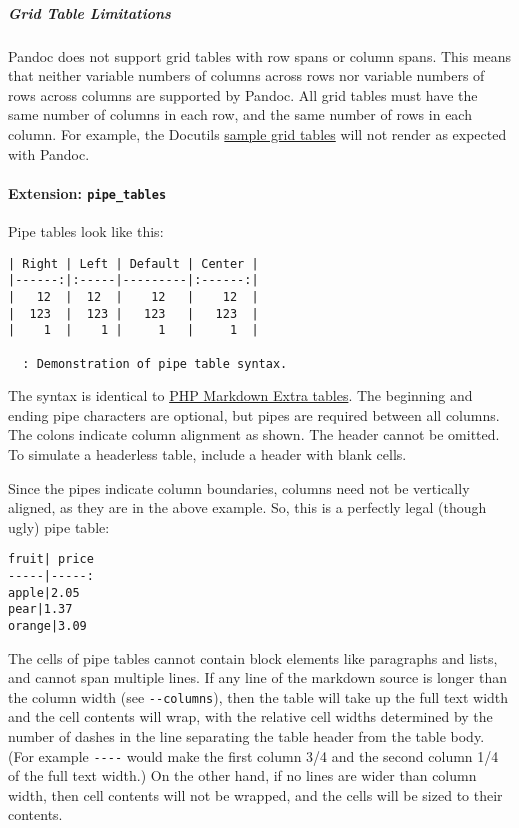 \documentclass[
]{article}
\begin{document}
\subparagraph{Grid Table Limitations}\label{grid-table-limitations}

Pandoc does not support grid tables with row spans or column spans. This
means that neither variable numbers of columns across rows nor variable
numbers of rows across columns are supported by Pandoc. All grid tables
must have the same number of columns in each row, and the same number of
rows in each column. For example, the Docutils
\href{https://docutils.sourceforge.io/docs/ref/rst/restructuredtext.html\#grid-tables}{sample
grid tables} will not render as expected with Pandoc.

\paragraph{\texorpdfstring{Extension:
\texttt{pipe\_tables}}{Extension: pipe\_tables}}\label{extension-pipe_tables}

Pipe tables look like this:

\begin{verbatim}
| Right | Left | Default | Center |
|------:|:-----|---------|:------:|
|   12  |  12  |    12   |    12  |
|  123  |  123 |   123   |   123  |
|    1  |    1 |     1   |     1  |

  : Demonstration of pipe table syntax.
\end{verbatim}

The syntax is identical to
\href{https://michelf.ca/projects/php-markdown/extra/\#table}{PHP
Markdown Extra tables}. The beginning and ending pipe characters are
optional, but pipes are required between all columns. The colons
indicate column alignment as shown. The header cannot be omitted. To
simulate a headerless table, include a header with blank cells.

Since the pipes indicate column boundaries, columns need not be
vertically aligned, as they are in the above example. So, this is a
perfectly legal (though ugly) pipe table:

\begin{verbatim}
fruit| price
-----|-----:
apple|2.05
pear|1.37
orange|3.09
\end{verbatim}

The cells of pipe tables cannot contain block elements like paragraphs
and lists, and cannot span multiple lines. If any line of the markdown
source is longer than the column width (see \texttt{-\/-columns}), then
the table will take up the full text width and the cell contents will
wrap, with the relative cell widths determined by the number of dashes
in the line separating the table header from the table body. (For
example \texttt{-\/-\/-\textbar{}-} would make the first column 3/4 and
the second column 1/4 of the full text width.) On the other hand, if no
lines are wider than column width, then cell contents will not be
wrapped, and the cells will be sized to their contents.
\end{document}
